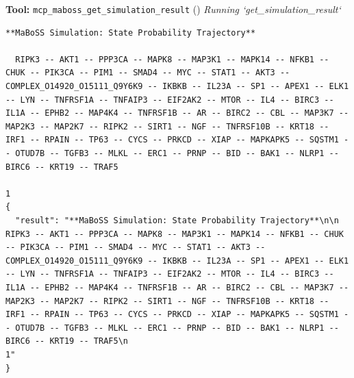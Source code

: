 \documentclass[11pt,a4paper]{article}
\begin{document}
\begin{toolokbox}
\textbf{Tool:} \texttt{mcp\_maboss\_get\_simulation\_result} (\checkmark)
\textit{Running `get\_simulation\_result`}
\begin{lstlisting}
**MaBoSS Simulation: State Probability Trajectory**

  RIPK3 -- AKT1 -- PPP3CA -- MAPK8 -- MAP3K1 -- MAPK14 -- NFKB1 -- CHUK -- PIK3CA -- PIM1 -- SMAD4 -- MYC -- STAT1 -- AKT3 -- COMPLEX_O14920_O15111_Q9Y6K9 -- IKBKB -- IL23A -- SP1 -- APEX1 -- ELK1 -- LYN -- TNFRSF1A -- TNFAIP3 -- EIF2AK2 -- MTOR -- IL4 -- BIRC3 -- IL1A -- EPHB2 -- MAP4K4 -- TNFRSF1B -- AR -- BIRC2 -- CBL -- MAP3K7 -- MAP2K3 -- MAP2K7 -- RIPK2 -- SIRT1 -- NGF -- TNFRSF10B -- KRT18 -- IRF1 -- RPAIN -- TP63 -- CYCS -- PRKCD -- XIAP -- MAPKAPK5 -- SQSTM1 -- OTUD7B -- TGFB3 -- MLKL -- ERC1 -- PRNP -- BID -- BAK1 -- NLRP1 -- BIRC6 -- KRT19 -- TRAF5
                                                                                                                                                                                                                                                                                                                                                                                                                                                                                                                                                                                    1
{
  "result": "**MaBoSS Simulation: State Probability Trajectory**\n\n  RIPK3 -- AKT1 -- PPP3CA -- MAPK8 -- MAP3K1 -- MAPK14 -- NFKB1 -- CHUK -- PIK3CA -- PIM1 -- SMAD4 -- MYC -- STAT1 -- AKT3 -- COMPLEX_O14920_O15111_Q9Y6K9 -- IKBKB -- IL23A -- SP1 -- APEX1 -- ELK1 -- LYN -- TNFRSF1A -- TNFAIP3 -- EIF2AK2 -- MTOR -- IL4 -- BIRC3 -- IL1A -- EPHB2 -- MAP4K4 -- TNFRSF1B -- AR -- BIRC2 -- CBL -- MAP3K7 -- MAP2K3 -- MAP2K7 -- RIPK2 -- SIRT1 -- NGF -- TNFRSF10B -- KRT18 -- IRF1 -- RPAIN -- TP63 -- CYCS -- PRKCD -- XIAP -- MAPKAPK5 -- SQSTM1 -- OTUD7B -- TGFB3 -- MLKL -- ERC1 -- PRNP -- BID -- BAK1 -- NLRP1 -- BIRC6 -- KRT19 -- TRAF5\n                                                                                                                                                                                                                                                                                                                                                                                                                                                                                                                                                                                    1"
}
\end{lstlisting}
\end{toolokbox}
\end{document}
